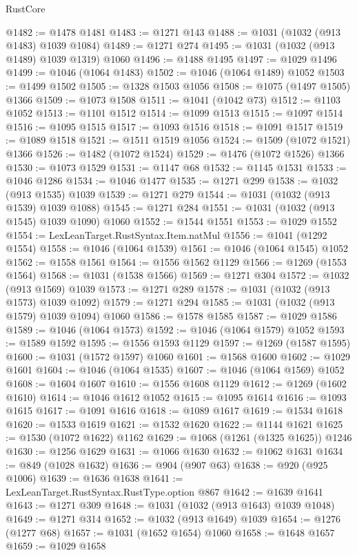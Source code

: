 \begin{lexlean}{RustCore}
\begin{coremodule}
@1482 := @1478 @1481
@1483 := @1271 @143
@1488 := @1031 (@1032 (@913 @1483) @1039 @1084)
@1489 := @1271 @274
@1495 := @1031 (@1032 (@913 @1489) @1039 @1319) @1060
@1496 := @1488 @1495
@1497 := @1029 @1496
@1499 := @1046 (@1064 @1483)
@1502 := @1046 (@1064 @1489) @1052
@1503 := @1499 @1502
@1505 := @1328 @1503 @1056
@1508 := @1075 (@1497 @1505) @1366
@1509 := @1073 @1508
@1511 := @1041 (@1042 @73)
@1512 := @1103 @1052
@1513 := @1101 @1512
@1514 := @1099 @1513
@1515 := @1097 @1514
@1516 := @1095 @1515
@1517 := @1093 @1516
@1518 := @1091 @1517
@1519 := @1089 @1518
@1521 := @1511 @1519 @1056
@1524 := @1509 (@1072 @1521) @1366
@1526 := @1482 (@1072 @1524)
@1529 := @1476 (@1072 @1526) @1366
@1530 := @1073 @1529
@1531 := @1147 @68
@1532 := @1145 @1531
@1533 := @1046 @1286
@1534 := @1046 @1477
@1535 := @1271 @299
@1538 := @1032 (@913 @1535) @1039
@1539 := @1271 @279
@1544 := @1031 (@1032 (@913 @1539) @1039 @1088)
@1545 := @1271 @284
@1551 := @1031 (@1032 (@913 @1545) @1039 @1090) @1060
@1552 := @1544 @1551
@1553 := @1029 @1552
@1554 := LexLeanTarget.RustSyntax.Item.natMul
@1556 := @1041 (@1292 @1554)
@1558 := @1046 (@1064 @1539)
@1561 := @1046 (@1064 @1545) @1052
@1562 := @1558 @1561
@1564 := @1556 @1562 @1129
@1566 := @1269 (@1553 @1564)
@1568 := @1031 (@1538 @1566)
@1569 := @1271 @304
@1572 := @1032 (@913 @1569) @1039
@1573 := @1271 @289
@1578 := @1031 (@1032 (@913 @1573) @1039 @1092)
@1579 := @1271 @294
@1585 := @1031 (@1032 (@913 @1579) @1039 @1094) @1060
@1586 := @1578 @1585
@1587 := @1029 @1586
@1589 := @1046 (@1064 @1573)
@1592 := @1046 (@1064 @1579) @1052
@1593 := @1589 @1592
@1595 := @1556 @1593 @1129
@1597 := @1269 (@1587 @1595)
@1600 := @1031 (@1572 @1597) @1060
@1601 := @1568 @1600
@1602 := @1029 @1601
@1604 := @1046 (@1064 @1535)
@1607 := @1046 (@1064 @1569) @1052
@1608 := @1604 @1607
@1610 := @1556 @1608 @1129
@1612 := @1269 (@1602 @1610)
@1614 := @1046 @1612 @1052
@1615 := @1095 @1614
@1616 := @1093 @1615
@1617 := @1091 @1616
@1618 := @1089 @1617
@1619 := @1534 @1618
@1620 := @1533 @1619
@1621 := @1532 @1620
@1622 := @1144 @1621
@1625 := @1530 (@1072 @1622) @1162
@1629 := @1068 (@1261 (@1325 @1625)) @1246
@1630 := @1256 @1629
@1631 := @1066 @1630
@1632 := @1062 @1631
@1634 := @849 (@1028 @1632)
@1636 := @904 (@907 @63)
@1638 := @920 (@925 @1006)
@1639 := @1636 @1638
@1641 := LexLeanTarget.RustSyntax.RustType.option @867
@1642 := @1639 @1641
@1643 := @1271 @309
@1648 := @1031 (@1032 (@913 @1643) @1039 @1048)
@1649 := @1271 @314
@1652 := @1032 (@913 @1649) @1039
@1654 := @1276 (@1277 @68)
@1657 := @1031 (@1652 @1654) @1060
@1658 := @1648 @1657
@1659 := @1029 @1658

\end{coremodule}
\end{lexlean}

